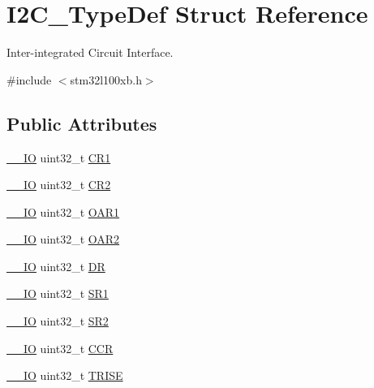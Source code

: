 \hypertarget{struct_i2_c___type_def}{\section{I2\-C\-\_\-\-Type\-Def Struct Reference}
\label{struct_i2_c___type_def}
}


Inter-\/integrated Circuit Interface.  




{\ttfamily \#include $<$stm32l100xb.\-h$>$}

\subsection*{Public Attributes}
\begin{DoxyCompactItemize}
\item 
\hyperlink{core__sc300_8h_aec43007d9998a0a0e01faede4133d6be}{\-\_\-\-\_\-\-I\-O} uint32\-\_\-t \hyperlink{struct_i2_c___type_def_a91782f7b81475b0e3c3779273abd26aa}{C\-R1}
\item 
\hyperlink{core__sc300_8h_aec43007d9998a0a0e01faede4133d6be}{\-\_\-\-\_\-\-I\-O} uint32\-\_\-t \hyperlink{struct_i2_c___type_def_a29eb47db03d5ad7e9b399f8895f1768c}{C\-R2}
\item 
\hyperlink{core__sc300_8h_aec43007d9998a0a0e01faede4133d6be}{\-\_\-\-\_\-\-I\-O} uint32\-\_\-t \hyperlink{struct_i2_c___type_def_ae8269169fcbdc2ecb580208d99c2f89f}{O\-A\-R1}
\item 
\hyperlink{core__sc300_8h_aec43007d9998a0a0e01faede4133d6be}{\-\_\-\-\_\-\-I\-O} uint32\-\_\-t \hyperlink{struct_i2_c___type_def_a73988a218be320999c74a641b3d6e3c1}{O\-A\-R2}
\item 
\hyperlink{core__sc300_8h_aec43007d9998a0a0e01faede4133d6be}{\-\_\-\-\_\-\-I\-O} uint32\-\_\-t \hyperlink{struct_i2_c___type_def_a5c1beaa4935359da1c8f0ceb287f90be}{D\-R}
\item 
\hyperlink{core__sc300_8h_aec43007d9998a0a0e01faede4133d6be}{\-\_\-\-\_\-\-I\-O} uint32\-\_\-t \hyperlink{struct_i2_c___type_def_a639be124227c03bb3f5fe0e7faf84995}{S\-R1}
\item 
\hyperlink{core__sc300_8h_aec43007d9998a0a0e01faede4133d6be}{\-\_\-\-\_\-\-I\-O} uint32\-\_\-t \hyperlink{struct_i2_c___type_def_ac509048af4b9ac67c808d584fdbc712e}{S\-R2}
\item 
\hyperlink{core__sc300_8h_aec43007d9998a0a0e01faede4133d6be}{\-\_\-\-\_\-\-I\-O} uint32\-\_\-t \hyperlink{struct_i2_c___type_def_a4d81b61d23a54d0d1e28646c3bb9aac5}{C\-C\-R}
\item 
\hyperlink{core__sc300_8h_aec43007d9998a0a0e01faede4133d6be}{\-\_\-\-\_\-\-I\-O} uint32\-\_\-t \hyperlink{struct_i2_c___type_def_a9f1a5aee4a26b2fb30e08f88586c436d}{T\-R\-I\-S\-E}
\end{DoxyCompactItemize}


